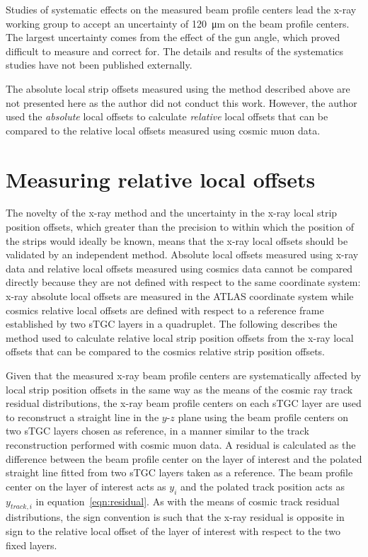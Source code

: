 Studies of systematic effects on the measured beam profile centers lead the x-ray working group to accept an uncertainty of \SI{120}{\micro\meter} on the beam profile centers. The largest uncertainty comes from the effect of the gun angle, which proved difficult to measure and correct for. The details and results of the systematics studies have not been published externally. 

The absolute local strip offsets measured using the method described above are not presented here as the author did not conduct this work. However, the author used the {\em absolute} local offsets to calculate {\em relative} local offsets that can be compared to the relative local offsets measured using cosmic muon data.

\section{Measuring relative local offsets}

The novelty of the x-ray method and the uncertainty in the x-ray local strip position offsets, which greater than the precision to within which the position of the strips would ideally be known, means that the x-ray local offsets should be validated by an independent method. Absolute local offsets measured using x-ray data and relative local offsets measured using cosmics data cannot be compared directly because they are not defined with respect to the same coordinate system: x-ray absolute local offsets are measured in the ATLAS coordinate system while cosmics relative local offsets are defined with respect to a reference frame established by two sTGC layers in a quadruplet. The following describes the method used to calculate relative local strip position offsets from the x-ray local offsets that can be compared to the cosmics relative strip position offsets.

Given that the measured x-ray beam profile centers are systematically affected by local strip position offsets in the same way as the means of the cosmic ray track residual distributions, the x-ray beam profile centers on each sTGC layer are used to reconstruct a straight line in the $y$-$z$ plane using the beam profile centers on two sTGC layers chosen as reference, in a manner similar to the track reconstruction performed with cosmic muon data. A residual is calculated as the difference between the beam profile center on the layer of interest and the polated straight line fitted from two sTGC layers taken as a reference. The beam profile center on the layer of interest acts as $y_{i}$ and the polated track position acts as $y_{track, i}$ in equation~\ref{eqn:residual}.  As with the means of cosmic track residual distributions, the sign convention is such that the x-ray residual is opposite in sign to the relative local offset of the layer of interest with respect to the two fixed layers. 

